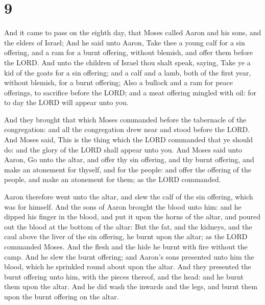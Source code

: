 \hypertarget{section-8}{%
\section{9}\label{section-8}}

 And it came to pass on the eighth day, that Moses called
Aaron and his sons, and the elders of Israel;  And he said
unto Aaron, Take thee a young calf for a sin offering, and a ram for a
burnt offering, without blemish, and offer them before the LORD.
 And unto the children of Israel thou shalt speak, saying,
Take ye a kid of the goats for a sin offering; and a calf and a lamb,
both of the first year, without blemish, for a burnt offering;
 Also a bullock and a ram for peace offerings, to
sacrifice before the LORD; and a meat offering mingled with oil: for to
day the LORD will appear unto you.

 And they brought that which Moses commanded before the
tabernacle of the congregation: and all the congregation drew near and
stood before the LORD.  And Moses said, This is the thing
which the LORD commanded that ye should do: and the glory of the LORD
shall appear unto you.  And Moses said unto Aaron, Go unto
the altar, and offer thy sin offering, and thy burnt offering, and make
an atonement for thyself, and for the people: and offer the offering of
the people, and make an atonement for them; as the LORD commanded.

 Aaron therefore went unto the altar, and slew the calf of
the sin offering, which was for himself.  And the sons of
Aaron brought the blood unto him: and he dipped his finger in the blood,
and put it upon the horns of the altar, and poured out the blood at the
bottom of the altar:  But the fat, and the kidneys, and
the caul above the liver of the sin offering, he burnt upon the altar;
as the LORD commanded Moses.  And the flesh and the hide
he burnt with fire without the camp.  And he slew the
burnt offering; and Aaron's sons presented unto him the blood, which he
sprinkled round about upon the altar.  And they presented
the burnt offering unto him, with the pieces thereof, and the head: and
he burnt them upon the altar.  And he did wash the
inwards and the legs, and burnt them upon the burnt offering on the
altar.


